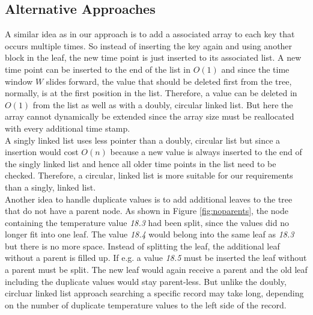 \documentclass[abstracton,12pt]{scrreprt}
\begin{document}
\subsection{Alternative Approaches}

A similar idea as in our approach is to add a associated array to each key that occurs multiple times. So instead of inserting the key again and using another block in the leaf, the new time point is just inserted to its associated list. A new time point can be inserted to the end of the list in $O(1)$ and since the time window $W$ slides forward, the value that should be deleted first from the tree, normally, is at the first position in the list. Therefore, a value can be deleted in $O(1)$ from the list as well as with a doubly, circular linked list. But here the array cannot dynamically be extended since the array size must be reallocated with every additional time stamp. \\
A singly linked list uses less pointer than a doubly, circular list but since a insertion would cost $O(n)$ because a new value is always inserted to the end of the singly linked list and hence all older time points in the list need to be checked. Therefore, a circular, linked list is more suitable for our requirements than a singly, linked list. \\
Another idea to handle duplicate values is to add additional leaves to the tree that do not have a parent node. As shown in Figure \ref{fig:noparents}, the node containing the temperature value \emph{18.3} had been split, since the values did no longer fit into one leaf. The value \emph{18.4} would belong into the same leaf as \emph{18.3} but there is no more space. Instead of splitting the leaf, the additional leaf without a parent is filled up. If e.g. a value \emph{18.5} must be inserted the leaf without a parent must be split. The new leaf would again receive a parent and the old leaf including the duplicate values would stay parent-less. But unlike the doubly, circluar linked list approach searching a specific record may take long, depending on the number of duplicate temperature values to the left side of the record.
\end{document}
